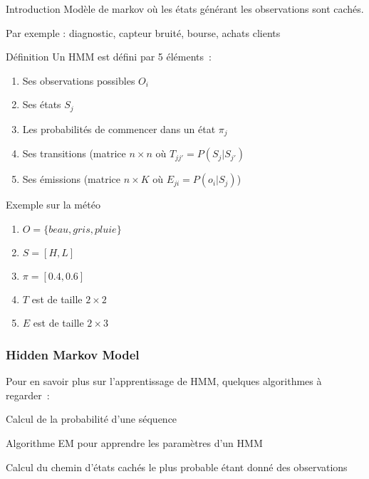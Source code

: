\begin{frame}{Introduction}
  Modèle de markov où les états générant les observations sont cachés.

  Par exemple : diagnostic, capteur bruité, bourse, achats clients

\end{frame}

\begin{frame}{Définition}
  Un HMM est défini par 5 éléments~:
  \begin{enumerate}[<+->]
  \item Ses observations possibles $O_i$
  \item Ses états $S_j$
  \item Les probabilités de commencer dans un état $\pi_j$
  \item Ses transitions (matrice $n\times n$ où $T_{jj'} = P(S_j|S_{j'})$
  \item Ses émissions (matrice $n\times K$ où $E_{ji} = P(o_i|S_j)$)
  \end{enumerate}
\end{frame}

\begin{frame}{Exemple sur la météo} 
  \begin{enumerate}[<+->]
  \item $O = \{beau,gris,pluie\}$ 
  \item $S =  [H, L]$
  \item $\pi = [0.4, 0.6]$
  \item $T$ est de taille $2 \times 2$ 
  \item $E$ est de taille $2\times 3$
  \end{enumerate}


\end{frame}

\begin{frame}
  \frametitle{Hidden Markov Model}
  Pour en savoir plus sur l'apprentissage de HMM, quelques algorithmes à regarder~:
  \begin{description}[<+->]
  \item[Forward-Backward] Calcul de la probabilité d'une séquence
  \item[Baum-Welch] Algorithme EM pour apprendre les paramètres d'un HMM
  \item[Viterbi] Calcul du chemin d'états cachés le plus probable étant donné des observations
  \end{description}
\end{frame}

